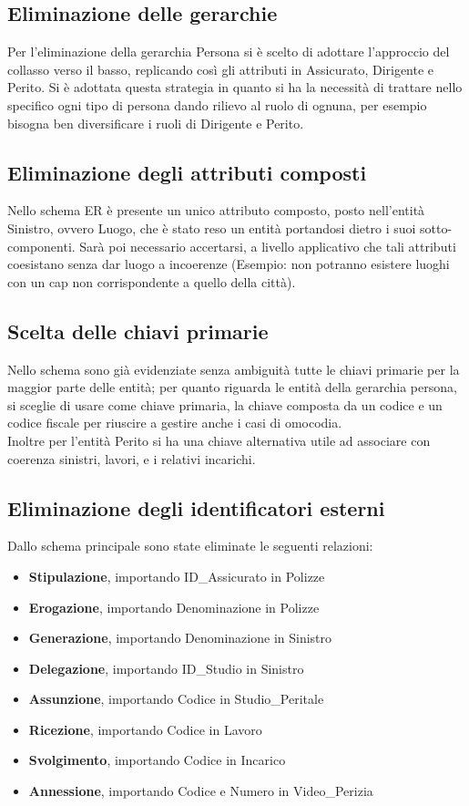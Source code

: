 \documentclass[a4paper,12pt]{report}
\begin{document}
\subsection{Eliminazione delle gerarchie}
Per l’eliminazione della gerarchia Persona si è scelto di adottare l’approccio del collasso verso il basso, replicando così gli attributi in Assicurato, Dirigente e Perito.
Si è adottata questa strategia in quanto si ha la necessità di trattare nello specifico ogni tipo di persona dando rilievo al ruolo di ognuna, per esempio bisogna ben diversificare i ruoli di Dirigente e Perito.
\\
\subsection{Eliminazione degli attributi composti}
Nello schema ER è presente un unico attributo composto, posto nell’entità Sinistro, ovvero Luogo, che è stato reso  un entità portandosi dietro i suoi sotto-componenti.
Sarà poi necessario accertarsi, a livello applicativo che tali attributi coesistano senza dar luogo a incoerenze (Esempio: non potranno esistere luoghi con un cap non corrispondente a quello della città).
\\
\subsection{Scelta delle chiavi primarie}
Nello schema sono già evidenziate senza ambiguità tutte le chiavi primarie per la maggior parte delle entità; per quanto riguarda le entità della gerarchia persona, si sceglie di usare come chiave primaria, la chiave composta da un codice e un codice fiscale per riuscire a gestire anche i casi di omocodia.
\\
Inoltre per l’entità Perito si ha una chiave alternativa utile ad associare con coerenza sinistri, lavori, e i relativi incarichi.
\clearpage
\subsection{Eliminazione degli identificatori esterni}
Dallo schema principale sono state eliminate le seguenti relazioni:
\begin{itemize}
    \item \textbf{Stipulazione}, importando ID\_Assicurato in Polizze
    \item \textbf{Erogazione}, importando Denominazione in Polizze
    \item \textbf{Generazione}, importando Denominazione in Sinistro
    \item \textbf{Delegazione}, importando ID\_Studio in Sinistro
    \item \textbf{Assunzione}, importando Codice in Studio\_Peritale
    \item \textbf{Ricezione}, importando Codice in Lavoro
    \item \textbf{Svolgimento}, importando Codice in Incarico
    \item \textbf{Annessione}, importando Codice e Numero in Video\_Perizia
\end{itemize}
\end{document}
